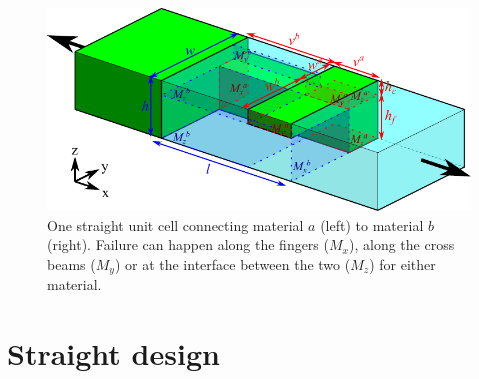 
\newcommand{\hc}{h_\text{c}}
\newcommand{\hf}{h_\text{f}}


\begin{figure}[H]
	\centering
	\includegraphics[width=\columnwidth]{sources/method/straight_model_v3.pdf}
	\caption{
		One straight unit cell connecting material $a$ (left) to material $b$ (right).
		Failure can happen along the fingers ($M_x$), along the cross beams ($M_y$) or at the interface between the two ($M_z$) for either material.}
	\label{fig:failure_modes}
\end{figure}


\section{Straight design}

